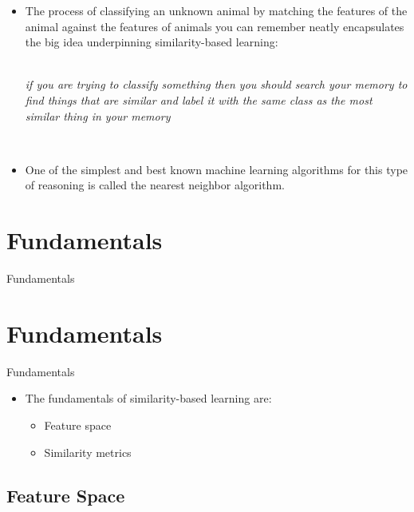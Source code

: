 \documentclass[xcolor={table}]{beamer}
\newcommand{\SectionSlide}[2][]{
	\ifthenelse{\isempty{#1}}
		{\section{#2}\begin{frame} \begin{center}\begin{huge}#2\end{huge}\end{center}\end{frame}}
		{\section[#1]{#2}\begin{frame} \begin{center}\begin{huge}#2\end{huge}\end{center}\end{frame}}
}
\begin{document}
\begin{frame} 
\begin{itemize}
\item The process of classifying an unknown animal by matching the features of the animal against the features of animals you can remember neatly encapsulates the big idea underpinning similarity-based learning: 

\begin{center} 

~\\

\textit{if you are trying to classify something then you should search your memory to find things that are similar and label it with the same class as the most similar thing in your memory}

~\\

\end{center}

\item One of the simplest and best known machine learning algorithms for this type of reasoning is called the \alert{nearest neighbor} algorithm. 
\end{itemize}
\end{frame} 


\SectionSlide{Fundamentals}

\begin{frame} 
\begin{itemize}
\item The fundamentals of similarity-based learning are:
\begin{itemize}
\item Feature space
\item Similarity metrics
\end{itemize}
\end{itemize}
\end{frame} 


\subsection{Feature Space}
\end{document}

